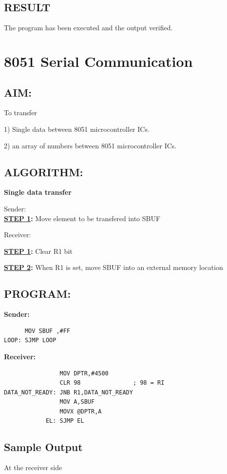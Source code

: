 \documentclass[a4paper,28pt,twoside,openright]{report}
\begin{document}
\section*{RESULT}
The program has been executed and the output verified.
%
%
%
%
\chapter{8051 Serial Communication}
\section*{AIM:}
To transfer 

 1) Single data between 8051 microcontroller ICs.
  
 2) an array of numbers  between 8051 microcontroller ICs.

\section*{ALGORITHM:}
\textbf{Single data transfer}

\large{Sender:}\\

\textbf{\underline{STEP 1}:} Move element to be transfered into SBUF

\vspace*{10pt}
\large{Receiver:}

\textbf{\underline{STEP 1}:} Clear R1 bit 

\textbf{\underline{STEP 2}:} When R1 is set, move SBUF into an external memory location



\section*{PROGRAM:}
\textbf{Sender:}
\begin{lstlisting}
      MOV SBUF ,#FF
LOOP: SJMP LOOP
\end{lstlisting}

\newpage

\textbf{Receiver:}
\begin{lstlisting}
                MOV DPTR,#4500
                CLR 98               ; 98 = RI 
DATA_NOT_READY: JNB R1,DATA_NOT_READY
                MOV A,SBUF
                MOVX @DPTR,A
            EL: SJMP EL
\end{lstlisting}




\section*{Sample Output}
At the receiver side
\end{document}
